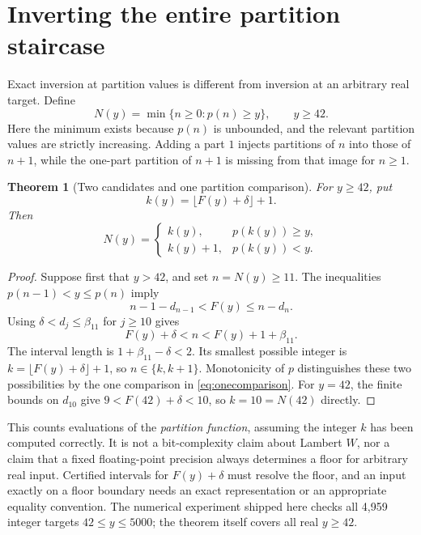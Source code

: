 \documentclass[11pt]{article}
\numberwithin{equation}{section}
\newtheorem{theorem}{Theorem}[section]
\theoremstyle{definition}
\theoremstyle{remark}
\begin{document}
\section{Inverting the entire partition staircase}\label{sec:staircase}
Exact inversion at partition values is different from inversion at an
arbitrary real target. Define
\begin{equation}\label{eq:N}
 N(y)=\min\{n\ge0:p(n)\ge y\},\qquad y\ge42.
\end{equation}
Here the minimum exists because $p(n)$ is unbounded, and the relevant
partition values are strictly increasing. Adding a part $1$ injects
partitions of $n$ into those of $n+1$, while the one-part partition of
$n+1$ is missing from that image for $n\ge1$.

\begin{theorem}[Two candidates and one partition comparison]\label{thm:staircase}
For $y\ge42$, put
\begin{equation}\label{eq:k}
 k(y)=\lfloor F(y)+\delta\rfloor+1.
\end{equation}
Then
\begin{equation}\label{eq:onecomparison}
 N(y)=
 \begin{cases}
 k(y),&p(k(y))\ge y,\\
 k(y)+1,&p(k(y))<y.
 \end{cases}
\end{equation}
\end{theorem}
\begin{proof}
Suppose first that $y>42$, and set $n=N(y)\ge11$.
The inequalities $p(n-1)<y\le p(n)$ imply
\[
 n-1-d_{n-1}<F(y)\le n-d_n.
\]
Using $\delta<d_j\le\beta_{11}$ for $j\ge10$ gives
\begin{equation}\label{eq:staircaseinterval}
 F(y)+\delta<n<F(y)+1+\beta_{11}.
\end{equation}
The interval length is $1+\beta_{11}-\delta<2$. Its smallest possible
integer is $k=\lfloor F(y)+\delta\rfloor+1$, so $n\in\{k,k+1\}$.
Monotonicity of $p$ distinguishes these two possibilities by the one
comparison in \eqref{eq:onecomparison}. For $y=42$, the finite bounds on
$d_{10}$ give $9<F(42)+\delta<10$, so $k=10=N(42)$ directly.
\end{proof}

This counts evaluations of the \emph{partition function}, assuming the
integer $k$ has been computed correctly. It is not a bit-complexity
claim about Lambert $W$, nor a claim that a fixed floating-point
precision always determines a floor for arbitrary real input.
Certified intervals for $F(y)+\delta$ must resolve the floor, and an
input exactly on a floor boundary needs an exact representation or an
appropriate equality convention. The numerical experiment shipped here
checks all 4,959 integer targets $42\le y\le5000$; the theorem itself
covers all real $y\ge42$.
\end{document}
